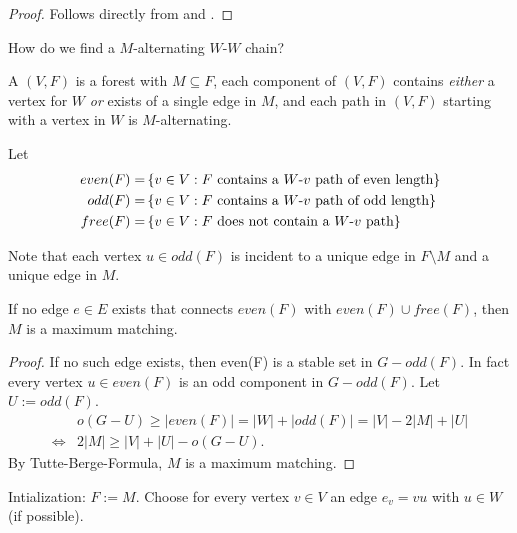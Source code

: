 \begin{proof}
	Follows directly from  and .
\end{proof}

How do we find a $M$-alternating $W$-$W$ chain?
\begin{defn}
	A  $(V,F)$ is a
	forest with $ M \subseteq F$, each component of $(V,F)$ contains 
	\emph{either} a vertex for $W$ \emph{or} exists of a single edge in $M$,
	and each path in $(V,F)$ starting with a vertex in $W$ is 
	$M$-alternating.
	
	Let \begin{align*}
		even(F) =& \left\{ v \in V: F \text{ contains a $W$-$v$ path of even length}\right\} \\
		odd(F) =& \left\{ v \in V: F \text{ contains a $W$-$v$ path of odd length}\right\} \\
		free(F) =& \left\{ v \in V: F \text{ does not contain a $W$-$v$ path}\right\} 
	\end{align*}
	
	
	Note that each vertex $u \in odd(F)$ is incident to a unique edge in
	$F \setminus M$ and a unique edge in $M$.
\end{defn}

\begin{lem}
	If no edge $e \in E$ exists that connects $even(F)$ with $even(F) \cup 
	free(F)$, then $M$ is a maximum matching.
\end{lem}

\begin{proof}
	If no such edge exists, then even(F) is a stable set in $G - odd(F)$.
	In fact every vertex $u \in even(F)$ is an odd component in $G - odd(F)$.
	Let $U:=odd(F)$.
	\begin{align*}
		& o(G-U) \geq | even(F)| = |W| + |odd(F)| = |V| - 2 |M| + |U| \\
		\Leftrightarrow& 2 |M| \geq |V| + |U| - o(G-U).
	\end{align*}
	By Tutte-Berge-Formula, $M$ is a maximum matching.
\end{proof}

Intialization: $F:=M$. Choose for every vertex $v \in V$ an edge $e_v = vu$ with $u \in W$ (if possible).

